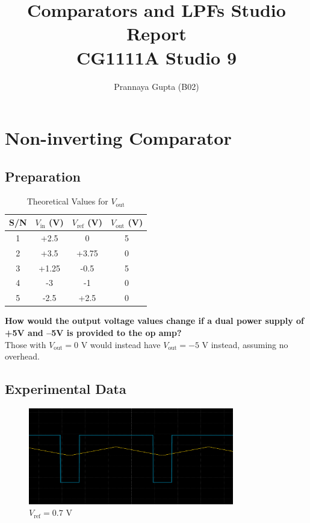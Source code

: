 \documentclass[a4paper,12pt,oneside, tikz]{book}
\title{\textbf{Comparators and LPFs} Studio Report \\ CG1111A Studio 9}
\author{Prannaya Gupta (B02)}
\begin{document}
\maketitle

\chapter{Non-inverting Comparator}

\section{Preparation}

\begin{table}[H]
    \centering
    \begin{tabular}{|c|c|c|c|}
        \hline S/N & $V_\text{in}$ (V) & $V_\text{ref}$ (V) & $V_\text{out}$ (V)  \\
        \hline 1 & +2.5 & 0 & 5 \\
            2 & +3.5 & +3.75 & 0 \\
            3 & +1.25 & -0.5 & 5 \\
            4 & -3 & -1 & 0 \\
            5 & -2.5 & +2.5 & 0 \\
        \hline
    \end{tabular}
    \caption{Theoretical Values for $V_\text{out}$}
    \label{tab:vout1}
\end{table}

\begin{tcolorbox}
\textbf{How would the output voltage values change if a dual power supply of +5V and –5V is provided to the op amp?} \\
Those with $V_\text{out} = 0$ V would instead have $V_\text{out} = -5$ V instead, assuming no overhead.
\end{tcolorbox}

\section{Experimental Data}

\begin{figure}[H]
    \centering
    \includegraphics[width=0.8\textwidth]{./images/0_7.png}
    \caption{$V_\text{ref} = 0.7$ V}
    \label{fig:0_7}
\end{figure}
\end{document}
